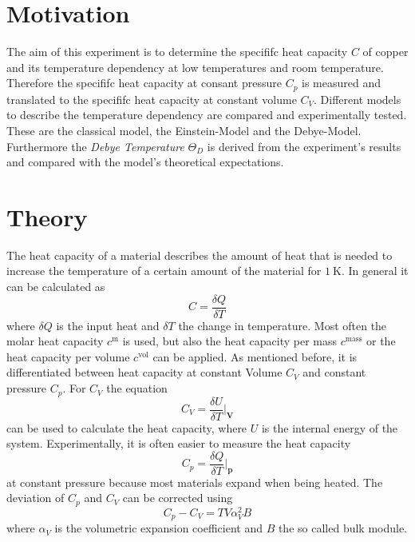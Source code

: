 \section{Motivation}
\label{sec:Motivation}
The aim of this experiment is to determine the specififc heat capacity $C$ of copper and its temperature dependency at low temperatures and room temperature.
Therefore the specififc heat capacity at consant pressure $C_p$ is measured and translated to the specififc heat capacity at constant volume $C_V$.
Different models to describe the temperature dependency are compared and experimentally tested. These are the classical model, the Einstein-Model and the Debye-Model.
Furthermore the \textit{Debye Temperature} $\Theta_D$ is 
derived from the experiment's results and compared with the model's theoretical expectations.


\section{Theory}
\label{sec:Theory}
The heat capacity of a material describes the amount of heat that is needed to increase the temperature of a certain amount of the material for $\qty{1}{\kelvin}$.
In general it can be calculated as 
\begin{equation*}
    C = \frac{\delta Q}{\delta T}
\end{equation*}
where $\delta Q$ is the input heat and $\delta T$ the change in temperature.
Most often the molar heat capacity $c^\text{m}$ is used, but also the heat capacity per mass $c^\text{mass}$ or the heat capacity per volume $c^\text{vol}$ can be applied.
As mentioned before, it is differentiated between heat capacity at constant Volume $C_V$ and constant pressure $C_p$.
For $C_V$ the equation 
\begin{equation}
    \label{eqn:CV}
    C_V = \frac{\delta U}{\delta T} \biggr\rvert_{\mathbf{V}}
\end{equation}
can be used to calculate the heat capacity, where $U$ is the internal energy of the system. Experimentally, it is often easier to measure the heat capacity
\begin{equation*}
    C_p = \frac{\delta Q}{\delta T} \biggr\rvert_{\mathbf{p}}
\end{equation*}
at constant pressure because most materials expand when being heated.
The deviation of $C_p$ and $C_V$ can be corrected using 
\begin{equation}
    \label{eqn:Cp_CV}
    C_p - C_V = T V \alpha^2_V B
\end{equation}
where $\alpha_V$ is the volumetric expansion coefficient and $B$ the so called bulk module.

